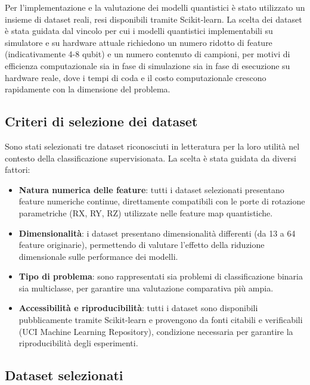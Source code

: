 Per l'implementazione e la valutazione dei modelli quantistici è stato utilizzato un insieme di dataset reali, resi disponibili tramite Scikit-learn. La scelta dei dataset è stata guidata dal vincolo per cui i modelli quantistici implementabili su simulatore e su hardware attuale richiedono un numero ridotto di feature (indicativamente 4-8 qubit) e un numero contenuto di campioni, per motivi di efficienza computazionale sia in fase di simulazione sia in fase di esecuzione su hardware reale, dove i tempi di coda e il costo computazionale crescono rapidamente con la dimensione del problema.

\subsection{Criteri di selezione dei dataset}
Sono stati selezionati tre dataset riconosciuti in letteratura per la loro utilità nel contesto della classificazione supervisionata. La scelta è stata guidata da diversi fattori:
\begin{itemize}
    \item \textbf{Natura numerica delle feature}: tutti i dataset selezionati presentano feature numeriche continue, direttamente compatibili con le porte di rotazione parametriche (RX, RY, RZ) utilizzate nelle feature map quantistiche.
    \item \textbf{Dimensionalità}: i dataset presentano dimensionalità differenti (da 13 a 64 feature originarie), permettendo di valutare l'effetto della riduzione dimensionale sulle performance dei modelli.
    \item \textbf{Tipo di problema}: sono rappresentati sia problemi di classificazione binaria sia multiclasse, per garantire una valutazione comparativa più ampia.
    \item \textbf{Accessibilità e riproducibilità}: tutti i dataset sono disponibili pubblicamente tramite Scikit-learn e provengono da fonti citabili e verificabili (UCI Machine Learning Repository), condizione necessaria per garantire la riproducibilità degli esperimenti.
\end{itemize}

\subsection{Dataset selezionati}

